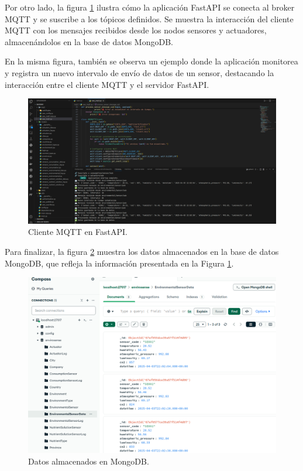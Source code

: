 Por otro lado, la figura \ref{fig:cliente_mqtt} ilustra cómo la aplicación
FastAPI se conecta al broker MQTT y se suscribe a los tópicos definidos. Se
muestra la interacción del cliente MQTT con los mensajes recibidos desde los
nodos sensores y actuadores, almacenándolos en la base de datos MongoDB.

En la misma figura, también se observa un ejemplo donde la aplicación monitorea
y registra un nuevo intervalo de envío de datos de un sensor, destacando la
interacción entre el cliente MQTT y el servidor FastAPI.

\begin{figure}[H]
    \centering
    \includegraphics[width=.99\textwidth]{./Images/21.png}
    \caption{Cliente MQTT en FastAPI.}
    \label{fig:cliente_mqtt}
\end{figure}

Para finalizar, la figura \ref{fig:mongodb} muestra los datos almacenados en la
base de datos MongoDB, que refleja la información presentada en la Figura
\ref{fig:cliente_mqtt}.

\begin{figure}[H]
    \centering
    \includegraphics[width=.99\textwidth]{./Images/22.png}
    \caption{Datos almacenados en MongoDB.}
    \label{fig:mongodb}
\end{figure}


